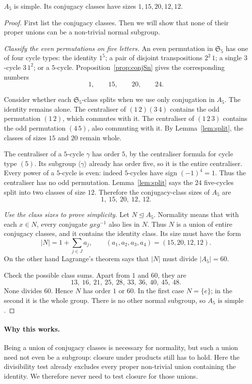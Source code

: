 \begin{theorem}\label{thm:a5}
$A_5$ is simple. Its conjugacy classes have sizes $1,15,20,12,12$.
\end{theorem}
\begin{proof}
First list the conjugacy classes. Then we will
show that none of their proper unions can be
a non-trivial normal subgroup.

\emph{Classify the even permutations on five letters.}
An even permutation in $\mathfrak S_5$
has one of four cycle types:
the identity $1^5$; a pair of disjoint
transpositions $2^2\,1$; a single
$3$-cycle $3\,1^2$; or a $5$-cycle.
Proposition~\ref{prop:conjSn} gives the
corresponding numbers
\[
1,\qquad15,\qquad20,\qquad24.
\]

Consider whether each $\mathfrak S_5$-class
splits when we use only conjugation in $A_5$.
The identity remains alone.
The centraliser of $(1\,2)(3\,4)$ contains
the odd permutation $(1\,2)$, which commutes
with it. The centraliser of $(1\,2\,3)$
contains the odd permutation $(4\,5)$,
also commuting with it. By Lemma~\ref{lem:split},
the classes of sizes $15$ and $20$ remain whole.

The centraliser of a $5$-cycle $\gamma$
has order $5$, by the centraliser formula
for cycle type $(5)$. Its subgroup
$\langle\gamma\rangle$ already has order
five, so it is the entire centraliser.
Every power of a $5$-cycle is even:
indeed $5$-cycles have sign $(-1)^4=1$.
Thus the centraliser has no odd permutation.
Lemma~\ref{lem:split} says the $24$ five-cycles
split into two classes of size $12$.
Therefore the conjugacy-class sizes of $A_5$ are
\[
\boxed{1,\ 15,\ 20,\ 12,\ 12}.
\]

\emph{Use the class sizes to prove simplicity.}
Let $N\trianglelefteq A_5$. Normality means
that with each $x\in N$, every conjugate
$gxg^{-1}$ also lies in $N$.
Thus $N$ is a union of entire conjugacy classes,
and it contains the identity class.
Its size must have the form
\[
|N|=1+\sum_{j\in J}a_j,
\qquad(a_1,a_2,a_3,a_4)=(15,20,12,12).
\]
On the other hand Lagrange's theorem says
that $|N|$ must divide $|A_5|=60$.

Check the possible class sums. Apart from $1$
and $60$, they are
\[
13,\ 16,\ 21,\ 25,\ 28,\ 33,\ 36,\ 40,\ 45,\ 48.
\]
None divides $60$. Hence $N$ has order
$1$ or $60$. In the first case $N=\{e\}$;
in the second it is the whole group.
There is no other normal subgroup, so
$\boxed{A_5\text{ is simple}}$.
\end{proof}

\paragraph{Why this works.}
Being a union of conjugacy classes is necessary for normality, but such a union need not even be a subgroup: closure under products still has to hold. Here the divisibility test already excludes every proper non-trivial union containing the identity. We therefore never need to test closure for those unions.

